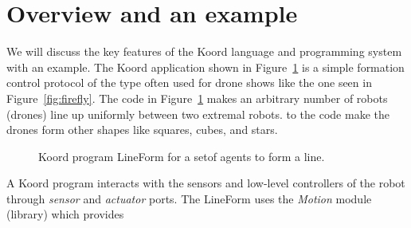 \section{Overview and an example}
\label{sec:overview}

%

We will discuss the key features of the Koord language and programming system with an example. The Koord application shown in Figure~\ref{fig:lineform} is a simple  formation control protocol of the type often used for drone shows like the one seen in Figure~\ref{fig:firefly}. The code in Figure~\ref{fig:lineform} makes an arbitrary number of robots (drones) line up uniformly between two extremal robots.  to the code make the drones form other shapes like  squares, cubes, and stars. 

%



\begin{figure}[h!]
    {
        
    }
    {
        
    }
    \caption{Koord program {\sf LineForm} for a setof agents to form a line.}
    \label{fig:lineform}
\end{figure}

A Koord program interacts with the sensors and low-level controllers of the robot through \emph{sensor} and \emph{actuator} ports.
%
The {\sf LineForm}  uses the {\em Motion\/} module (library) which provides 

